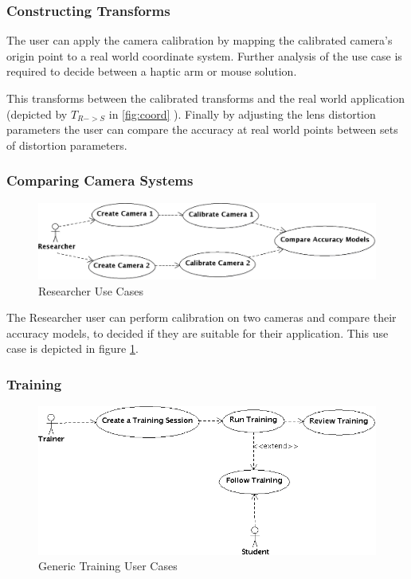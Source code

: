 \documentclass[11pt]{report}
\begin{document}
\subsubsection{Constructing Transforms}
The user can apply the camera calibration by mapping the calibrated camera's origin point to a real world coordinate system.  Further analysis of the use case is required to decide between a haptic arm or mouse solution.

This transforms between the calibrated transforms and the real world application (depicted by \( T_{R->S} \) in \ref{fig:coord} ). Finally by adjusting the lens distortion parameters the user can compare the accuracy at real world points between sets of distortion parameters.  

\subsubsection{Comparing Camera Systems} 

\begin{figure}[htp]
\centering
\includegraphics[scale=0.15]{images/CompareCameras.png}
\caption{Researcher Use Cases}
\label{fig:ucc}
\end{figure}

The Researcher user can perform calibration on two cameras and compare their accuracy models, to decided if they are suitable for their application. This use case is depicted in figure \ref{fig:ucc}.

\subsubsection{Training}

\begin{figure}[htp]
\centering
\includegraphics[scale=0.45]{images/Training.png}
\caption{Generic Training User Cases}
\label{fig:uco}
\end{figure}
\end{document}
